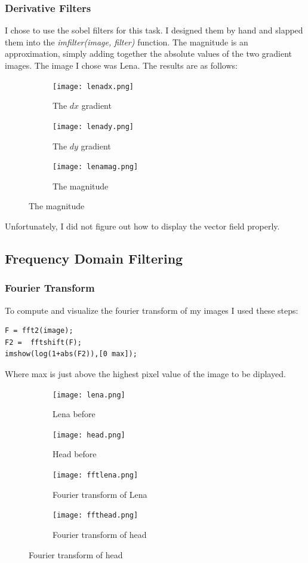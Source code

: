 \documentclass{article}
\begin{document}
\newpage
\subsubsection{Derivative Filters}
I chose to use the sobel filters for this task. I designed them by hand and slapped them into the \emph{imfilter(image, filter)} function.
The magnitude is an approximation, simply adding together the absolute values of the two gradient images. The image I chose was Lena.
The results are as follows:\\

\begin{figure}[h]
	\centering
	\begin{subfigure}[t]{0.49\textwidth}
		\texttt{[image: lenadx.png]}
		\caption{The $dx$ gradient}
		\label{fig:lenadx.png}
	\end{subfigure}
	\begin{subfigure}[t]{0.49\textwidth}
		\texttt{[image: lenady.png]}
		\caption{The $dy$ gradient}
		\label{fig:lenady.png}
	\end{subfigure}
	\begin{subfigure}[b]{0.49\textwidth}
		\texttt{[image: lenamag.png]}
		\caption{The magnitude}
		\label{fig:lenamag.png}
	\end{subfigure}
\end{figure}

Unfortunately, I did not figure out how to display the vector field properly.

\newpage
\subsection{Frequency Domain Filtering}
\subsubsection{Fourier Transform}
To compute and visualize the fourier transform of my images I used these steps:
\begin{lstlisting}
F = fft2(image);
F2 =  fftshift(F);
imshow(log(1+abs(F2)),[0 max]);
\end{lstlisting}
Where max is just above the highest pixel value of the image to be diplayed.


\begin{figure}[h]
	\centering
	\begin{subfigure}[t]{0.45\textwidth}
		\texttt{[image: lena.png]}
		\caption{Lena before}
		\label{fig:lena.png}
	\end{subfigure}
	\begin{subfigure}[t]{0.45\textwidth}
		\texttt{[image: head.png]}
		\caption{Head before}
		\label{fig:head.png}
	\end{subfigure}
	\begin{subfigure}[b]{0.45\textwidth}
		\texttt{[image: fftlena.png]}
		\caption{Fourier transform of Lena}
		\label{fig:fftlena.png}
	\end{subfigure}
	\begin{subfigure}[b]{0.45\textwidth}
		\texttt{[image: ffthead.png]}
		\caption{Fourier transform of head}
		\label{fig:ffthead.png}
	\end{subfigure}
\end{figure}
\end{document}

